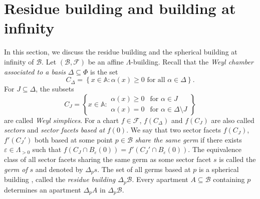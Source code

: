 \documentclass[12pt]{amsart}
\newcommand{\F}{\mathbb{F} }
\newcommand{\K}{\mathbb{K}}
\newcommand{\A}{\mathbb{A}}
\newcommand{\Fun}{\mathscr{F}} %
\newcommand{\B}{\mathcal{B}}
\numberwithin{equation}{section}
\theoremstyle{remark} %
\begin{document}

\section{Residue building and building at infinity}\label{sec:assoc-buildings}

In this section, we discuss the residue building and the spherical building at infinity of $\B$.
Let $(\B,\Fun)$ be an affine $\Lambda$-building. Recall that the \emph{Weyl chamber associated to a basis} $\Delta \subseteq \Phi$ is the set
$$
C_\Delta = \left\{ x \in \mathbb{A} \colon \alpha(x) \geq 0 \text{ for all } \alpha \in \Delta \right\}.
$$ 
For $J\subseteq \Delta$, the subsets
$$
C_J = \left\{x \in \A \colon \begin{array}{ll}
\alpha(x) \geq 0 & \text{for }  \alpha \in J \\
\alpha(x) = 0 & \text{for } \alpha \in \Delta \setminus J
\end{array}\right\}
$$
are called \emph{Weyl simplices}. For a chart $f \in \Fun$, $f(C_\Delta)$ and $f(C_J)$ are also called \emph{sectors} and \emph{sector facets based at} $f(0)$. We say that two sector facets $f(C_J)$, $f'(C_J')$ both based at some point $p \in \B$ \emph{share the same germ} if there exists $\varepsilon \in \Lambda_{>0}$ such that $f(C_J \cap B_{\varepsilon}(0)) = f'(C_J' \cap B_{\varepsilon}(0))$. The equivalence class of all sector facets sharing the same germ as some sector facet $s$ is called the \emph{germ of} $s$ and denoted by $\Delta_p s$. The set of all germs based at $p$ is a spherical building \cite[Theorem 5.17]{Sch09}, called the \emph{residue building $\Delta_p\B$}. Every apartment $A\subseteq \B$ containing $p$ determines an apartment $\Delta_p A$ in $\Delta_p \B$.
\end{document}

